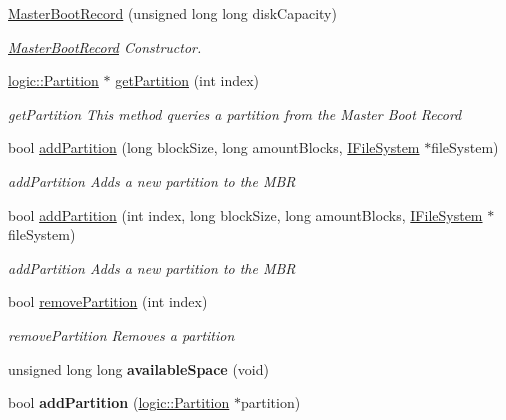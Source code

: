 \begin{DoxyCompactItemize}
\item 
\mbox{\hyperlink{classcore_1_1disk_1_1_master_boot_record_ad037f4c38e76f64b7d06f8795531442c}{Master\+Boot\+Record}} (unsigned long long disk\+Capacity)
\begin{DoxyCompactList}\small\item\em \mbox{\hyperlink{classcore_1_1disk_1_1_master_boot_record}{Master\+Boot\+Record}} Constructor. \end{DoxyCompactList}\item 
\mbox{\hyperlink{classcore_1_1logic_1_1_partition}{logic\+::\+Partition}} $\ast$ \mbox{\hyperlink{classcore_1_1disk_1_1_master_boot_record_a857825face8484c5bbc23768cd4344d6}{get\+Partition}} (int index)
\begin{DoxyCompactList}\small\item\em get\+Partition This method queries a partition from the Master Boot Record \end{DoxyCompactList}\item 
bool \mbox{\hyperlink{classcore_1_1disk_1_1_master_boot_record_ab1f46cc41735db1fcdd2aef912da29a4}{add\+Partition}} (long block\+Size, long amount\+Blocks, \mbox{\hyperlink{classcore_1_1_i_file_system}{I\+File\+System}} $\ast$file\+System)
\begin{DoxyCompactList}\small\item\em add\+Partition Adds a new partition to the M\+BR \end{DoxyCompactList}\item 
bool \mbox{\hyperlink{classcore_1_1disk_1_1_master_boot_record_a901d6bfb4b860b739e204be4f6cc47a4}{add\+Partition}} (int index, long block\+Size, long amount\+Blocks, \mbox{\hyperlink{classcore_1_1_i_file_system}{I\+File\+System}} $\ast$file\+System)
\begin{DoxyCompactList}\small\item\em add\+Partition Adds a new partition to the M\+BR \end{DoxyCompactList}\item 
bool \mbox{\hyperlink{classcore_1_1disk_1_1_master_boot_record_af155df4b9738c217678a8f875e679c50}{remove\+Partition}} (int index)
\begin{DoxyCompactList}\small\item\em remove\+Partition Removes a partition \end{DoxyCompactList}\item 
\mbox{\label{classcore_1_1disk_1_1_master_boot_record_a87a82e1edd865a766f6cf73de147a9e1}} 
unsigned long long {\bfseries available\+Space} (void)
\item 
\mbox{\label{classcore_1_1disk_1_1_master_boot_record_a2247447acf2ad887c9ef1effbd397fae}} 
bool {\bfseries add\+Partition} (\mbox{\hyperlink{classcore_1_1logic_1_1_partition}{logic\+::\+Partition}} $\ast$partition)
\end{DoxyCompactItemize}
